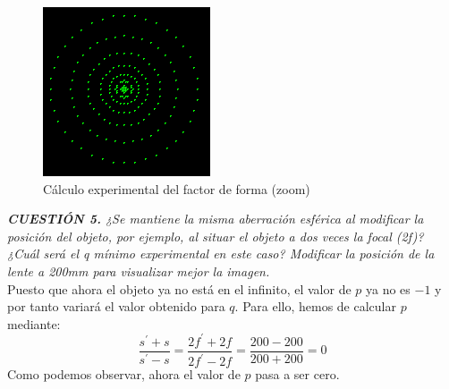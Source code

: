 \documentclass[11pt]{article}
\begin{document}
\begin{figure}[ht]
\begin{subcaptionblock}{.333\textwidth}
                    \caption{$q=0.7$}
                \end{subcaptionblock}%
                \begin{subcaptionblock}{.333\textwidth}
                    \centering
                    \includegraphics[width=\textwidth]{fotos/parte 1/Aberraciones/Aberración Esférica/67.png}
                    \caption{$q=0.77$}
                \end{subcaptionblock}    
                \caption{Cálculo experimental del factor de forma (zoom)}
            \end{figure}
            
            \textit{\textbf{CUESTIÓN 5.} ¿Se mantiene la misma aberración esférica al modificar la posición del objeto, por ejemplo, al situar el objeto a dos veces la focal (2f)? ¿Cuál será el q mínimo experimental en este caso? Modificar la posición de la lente a 200mm para visualizar mejor la imagen.}\\

            Puesto que ahora el objeto ya no está en el infinito, el valor de $p$ ya no es $-1$ y por tanto variará el valor obtenido para $q$. Para ello, hemos de calcular $p$ mediante:
            \begin{equation}
                \dfrac{s^\prime+s}{s^\prime-s}=\dfrac{2f^\prime + 2f}{2f^\prime - 2f}=\dfrac{200-200}{200+200}=0
                \label{eq:p}
            \end{equation}
            Como podemos observar, ahora el valor de $p$ pasa a ser cero.
            
\end{document}
